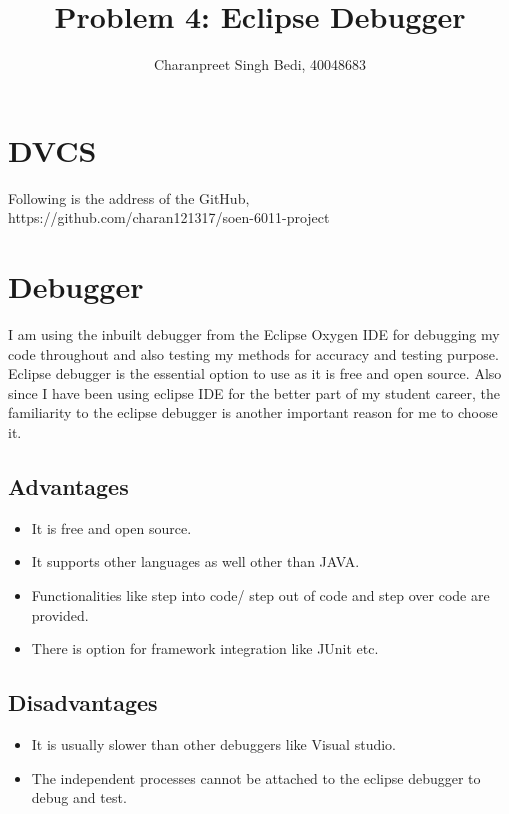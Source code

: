 \documentclass[12pt]{article}
\title{Problem 4: Eclipse Debugger}
\author{Charanpreet Singh Bedi, 40048683 }
\date{}
\begin{document}
\maketitle

\section{DVCS}
Following is the address of the GitHub,\\ https://github.com/charan121317/soen-6011-project

\section{Debugger}
I am using the inbuilt debugger from the Eclipse Oxygen IDE for debugging my code throughout and also testing my methods for accuracy and testing purpose. Eclipse debugger is the essential option to use as it is free and open source. Also since I have been using eclipse IDE for the better part of my student career, the familiarity to the eclipse debugger is another important reason for me to choose it.
\subsection{Advantages}
\begin{itemize}
    \item It is free and open source.
    \item It supports other languages as well other than JAVA.
    \item Functionalities like step into code/ step out of code and step over code are provided.
    \item There is option for framework integration like JUnit etc.
    
\end{itemize}

\subsection{Disadvantages}
\begin{itemize}
    \item It is usually slower than other debuggers like Visual studio.
    \item The independent processes cannot be attached to the eclipse debugger to debug and test.
\end{itemize}
\end{document}
